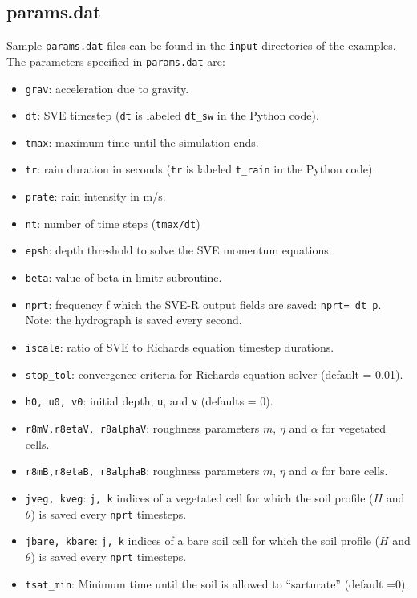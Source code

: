 \documentclass{article}
\newcommand{\code}[1]{\texttt{#1}}
\begin{document}
\subsection{params.dat}

Sample \code{params.dat} files can be found in the \code{input} directories of the examples.  The parameters specified in \code{params.dat} are:
  
\begin{itemize}
	\item \code{grav}: acceleration due to gravity.
	\item \code{dt}: SVE timestep (\code{dt} is labeled \code{dt\_sw} in the Python code). 
	\item \code{tmax}: maximum time until the simulation ends.
	\item \code{tr}: rain duration in seconds (\code{tr} is labeled \code{t\_rain} in the Python code). 
	\item \code{prate}: rain intensity in m/s.
	\item \code{nt}:  number of time steps  (\code{tmax/dt})
	\item \code{epsh}: depth threshold to solve the SVE momentum equations.
	\item \code{beta}: value of beta in limitr subroutine.
	\item \code{nprt}: frequency f which the SVE-R output fields are saved: \code{nprt= dt\_p}.  Note: the hydrograph is saved every second.
	\item \code{iscale}: ratio of SVE to Richards equation timestep durations.
	\item \code{stop\_tol}: convergence criteria for Richards equation solver (default = 0.01).
	\item \code{h0, u0, v0}: initial depth, \code{u}, and \code{v} (defaults = 0).
	\item \code{r8mV,r8etaV, r8alphaV}: roughness parameters $m$, $\eta$ and $\alpha$ for vegetated cells. 
	\item \code{r8mB,r8etaB, r8alphaB}: roughness parameters $m$, $\eta$ and $\alpha$ for bare cells. 
	\item \code{jveg, kveg}: \code{j, k} indices of a vegetated cell for which the soil profile ($H$ and $\theta$) is saved every \code{nprt} timesteps.
	\item \code{jbare, kbare}: \code{j, k} indices of a bare soil cell for which the soil profile ($H$ and $\theta$) is saved every \code{nprt} timesteps.
	\item \code{tsat\_min}: Minimum time until the soil is allowed to ``sarturate'' (default =0).
\end{itemize}
\end{document}
